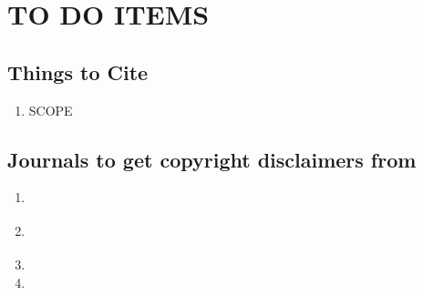 \chapter{TO DO ITEMS}

\section{Things to Cite}
\begin{enumerate}
 \item \chkBox SCOPE
\end{enumerate}

\section{Journals to get copyright disclaimers from}
\begin{enumerate}
 \item \chkBox \cite{Juhn2006} \cite{Sieglaff2009,bonizzoni2012complex,Bonizzoni2011,bonizzoni2012comparative,bonizzoni2012strain}
 \item \chkBox \cite{Sieglaff2009}
 \item \chkBox
 \item \chkBox
 \end{enumerate}